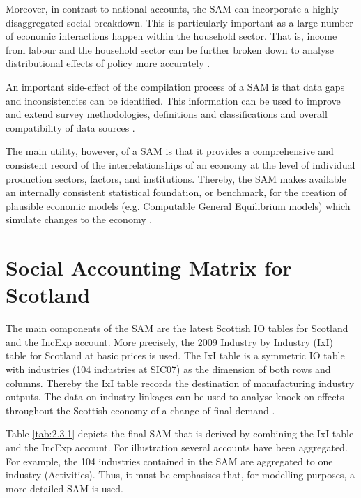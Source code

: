 \newpage

Moreover, in contrast to national accounts, the SAM can incorporate a highly disaggregated social breakdown. This is particularly important as a large number of economic interactions happen within the household sector. That is, income from labour and the household sector can be further broken down to analyse distributional effects of policy more accurately \cite{Stuttard2003b}.

\bigskip

An important side-effect of the compilation process of a SAM is that data gaps and inconsistencies can be identified. This information can be used to improve and extend survey methodologies, definitions and classifications and overall compatibility of data sources \cite{Keuning1988a}.

\bigskip

The main utility, however, of a SAM is that it provides a comprehensive and consistent record of the interrelationships of an economy at the level of individual production sectors, factors, and institutions. Thereby, the SAM makes available an internally consistent statistical foundation, or benchmark, for the creation of plausible economic models (e.g. Computable General Equilibrium models) which simulate changes to the economy \cite{Reinert1997a}.    

\newpage
\section{Social Accounting Matrix for Scotland}
\label{sec:2.3}

The main components of the SAM are the latest Scottish IO tables for Scotland \cite{ScottishGovernment2013a} and the IncExp account. More precisely, the 2009 Industry by Industry (IxI) table for Scotland at basic prices is used. The IxI table is a symmetric IO table with industries (104 industries at SIC07) as the dimension of both rows and columns. Thereby the IxI table records the destination of manufacturing industry outputs. The data on industry linkages can be used to analyse knock-on effects throughout the Scottish economy of a change of final demand \cite{ScottishGovernment2011a}.

\bigskip

Table \ref{tab:2.3.1} depicts the final SAM that is derived by combining the IxI table and the IncExp account. For illustration several accounts have been aggregated. For example, the 104 industries contained in the SAM are aggregated to one industry (Activities). Thus, it must be emphasises that, for modelling purposes, a more detailed SAM is used.  

